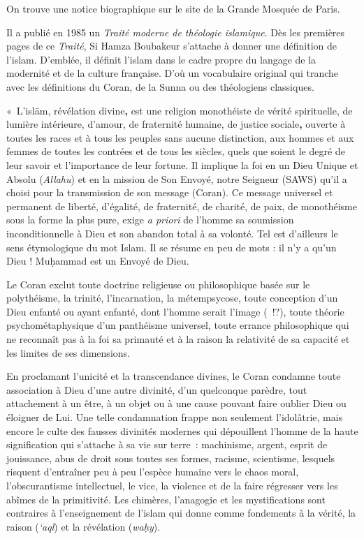 On trouve une notice biographique sur le site de la Grande Mosquée de
Paris.

Il a publié en 1985 un \emph{Traité moderne de théologie islamique}. Dès
les premières pages de ce \emph{Traité}, Si Hamza Boubakeur s'attache à
donner une définition de l'islam. D'emblée, il définit l'islam dans le
cadre propre du langage de la modernité et de la culture française. D'où
un vocabulaire original qui tranche avec les définitions du Coran, de la
Sunna ou des théologiens classiques.

«~L'islām, révélation divine\textbf{,} est une religion monothéiste de
vérité spirituelle, de lumière intérieure, d'amour, de fraternité
humaine, de justice sociale\textbf{,} ouverte à toutes les races et à
tous les peuples sans aucune distinction, aux hommes et aux femmes de
toutes les contrées et de tous les siècles, quels que soient le degré de
leur savoir et l'importance de leur fortune. Il implique la foi en un
Dieu Unique et Absolu (\emph{Allahu}) et en la mission de Son Envoyé,
notre Seigneur (SAWS) qu'il a choisi pour la transmission de son message
(Coran). Ce message universel et permanent de liberté, d'égalité, de
fraternité, de charité, de paix, de monothéisme sous la forme la plus
pure, exige \emph{a priori} de l'homme sa soumission inconditionnelle à
Dieu et son abandon total à sa volonté. Tel est d'ailleurs le sens
étymologique du mot Islam. Il se résume en peu de mots : il n'y a qu'un
Dieu ! Muḥammad est un Envoyé de Dieu.

Le Coran exclut toute doctrine religieuse ou philosophique basée sur le
polythéisme, la trinité, l'incarnation, la métempsycose, toute
conception d'un Dieu enfanté ou ayant enfanté, dont l'homme serait
l'image (~!?), toute théorie psychométaphysique d'un panthéisme
universel, toute errance philosophique qui ne reconnaît pas à la foi sa
primauté et à la raison la relativité de sa capacité et les limites de
ses dimensions.

En proclamant l'unicité et la transcendance divines, le Coran condamne
toute association à Dieu d'une autre divinité, d'un quelconque
parèdre, tout attachement à un
être, à un objet ou à une cause pouvant faire oublier Dieu ou éloigner
de Lui. Une telle condamnation frappe non seulement l'idolâtrie, mais
encore le culte des fausses divinités modernes qui dépouillent l'homme
de la haute signification qui s'attache à sa vie sur terre~: machinisme,
argent, esprit de jouissance, abus de droit sous toutes ses formes,
racisme, scientisme, lesquels risquent d'entraîner peu à peu l'espèce
humaine vers le chaos moral, l'obscurantisme intellectuel, le vice, la
violence et de la faire régresser vers les abîmes de la primitivité. Les
chimères, l'anagogie et les mystifications sont
contraires à l'enseignement de l'islam qui donne comme fondements à la
vérité, la raison (\emph{`aql}) et la révélation (\emph{waḥy}).

